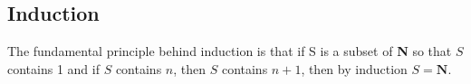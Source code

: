     \subsection*{Induction}
    The fundamental principle behind induction is that if S is a subset of \textbf{N} so that $S$ contains 1 and if $S$ contains $n$, then $S$ contains $n + 1$, then by induction $S = \textbf{N}$.
